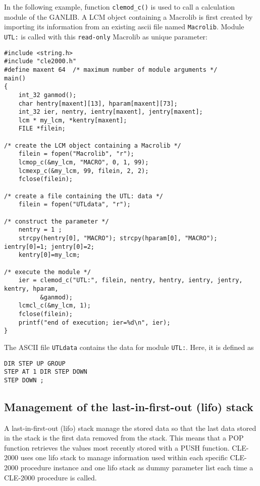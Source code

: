 \vskip 0.8cm

In the following example, function {\tt clemod\_c()} is used to call a calculation module of the GANLIB. A LCM object
containing a Macrolib is first created by importing its information from an existing {\sc ascii} file named {\tt Macrolib}.
Module {\tt UTL:} is called with this {\tt read-only} Macrolib as unique parameter:
\begin{verbatim}
#include <string.h>
#include "cle2000.h"
#define maxent 64  /* maximum number of module arguments */
main()
{
    int_32 ganmod();
    char hentry[maxent][13], hparam[maxent][73];
    int_32 ier, nentry, ientry[maxent], jentry[maxent];
    lcm * my_lcm, *kentry[maxent];
    FILE *filein;
    
/* create the LCM object containing a Macrolib */
    filein = fopen("Macrolib", "r");
    lcmop_c(&my_lcm, "MACRO", 0, 1, 99);
    lcmexp_c(&my_lcm, 99, filein, 2, 2);
    fclose(filein);
 
/* create a file containing the UTL: data */
    filein = fopen("UTLdata", "r");

/* construct the parameter */
    nentry = 1 ;
    strcpy(hentry[0], "MACRO"); strcpy(hparam[0], "MACRO"); ientry[0]=1; jentry[0]=2;
    kentry[0]=my_lcm;
 
/* execute the module */
    ier = clemod_c("UTL:", filein, nentry, hentry, ientry, jentry, kentry, hparam,
          &ganmod);    
    lcmcl_c(&my_lcm, 1);
    fclose(filein);
    printf("end of execution; ier=%d\n", ier);
}
\end{verbatim}

\vskip 0.08cm

The ASCII file {\tt UTLdata} contains the data for module {\tt UTL:}. Here, it is defined as
\begin{verbatim}
DIR STEP UP GROUP
STEP AT 1 DIR STEP DOWN
STEP DOWN ;
\end{verbatim}

\subsection{Management of the last-in-first-out (lifo) stack}\label{sect:lifo}

A last-in-first-out (lifo) stack manage the stored data so that the last data stored in the stack is the first data removed from the stack. This means that a POP function retrieves the values most recently stored with a PUSH function. CLE-2000 uses one lifo stack to manage information used within each specific CLE-2000 procedure instance and one lifo stack as dummy parameter list each time a CLE-2000 procedure is called.

